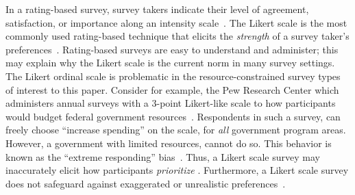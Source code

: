 

In a rating-based survey, survey takers indicate their level of agreement, satisfaction, or importance along an intensity scale~\cite{moors2016two}. The Likert scale is the most commonly used rating-based technique that elicits the \textit{strength} of a survey taker's preferences~\cite{likert1932technique}. Rating-based surveys are easy to understand and administer; this may explain why the Likert scale is the current norm in many survey settings. The Likert ordinal scale is problematic in the resource-constrained survey types of interest to this paper. Consider for example, the Pew Research Center which administers annual surveys with a 3-point Likert-like scale to  how participants would budget federal government resources~\cite{pew_spending}. Respondents in such a survey, can freely choose  ``increase spending'' on the scale, for \textit{all} government program areas. However, a government with limited resources, cannot do so. This behavior is known as the ``extreme responding'' bias~\cite{batchelor2016extreme, furnham1986response, meisenberg2008acquiescent}. Thus, a Likert scale survey may  inaccurately elicit how participants \textit{prioritize} . Furthermore, a Likert scale survey does not safeguard against exaggerated or unrealistic preferences~\cite{araujo2017much, vavreck2007exaggerated}.

